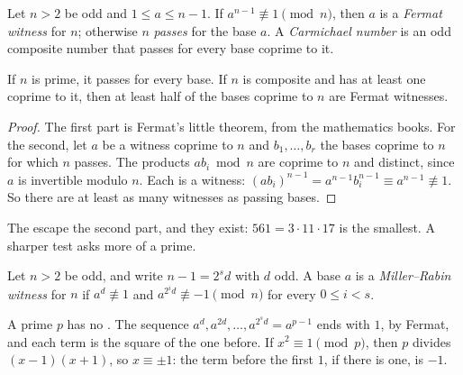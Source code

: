 \begin{definition}\label{def:b2:randomised-algorithms:fermat}
Let $n > 2$ be odd and $1 \leq a \leq n - 1$. If $a^{n-1} \not\equiv 1 \pmod n$, then $a$ is a \emph{Fermat
witness} for $n$; otherwise $n$ \emph{passes} for the base $a$. A \emph{Carmichael
number} is an odd composite number that passes for every base coprime to it.
\end{definition}

\begin{proposition}\label{prop:b2:randomised-algorithms:fermat}
If $n$ is prime, it passes for every base. If $n$ is composite and has at least one  coprime to it, then at
least half of the bases coprime to $n$ are Fermat witnesses.
\end{proposition}

\begin{proof}
The first part is Fermat's little theorem, from the mathematics books. For the second, let $a$ be a witness coprime to
$n$ and $b_1, \dots, b_r$ the bases coprime to $n$ for which $n$ passes. The products $ab_i \bmod n$ are coprime to $n$
and distinct, since $a$ is invertible modulo $n$. Each is a witness: $(ab_i)^{n-1} = a^{n-1} b_i^{n-1} \equiv a^{n-1}
\not\equiv 1$. So there are at least as many witnesses as passing bases.
\end{proof}

The  escape the second part, and they exist: $561 = 3 \cdot 11 \cdot 17$ is the smallest. A sharper
test asks more of a prime.

\begin{definition}\label{def:b2:randomised-algorithms:miller-rabin}
Let $n > 2$ be odd, and write $n - 1 = 2^s d$ with $d$ odd. A base $a$ is a \emph{Miller--Rabin witness} for $n$ if $a^d \not\equiv 1$ and $a^{2^i d} \not\equiv -1 \pmod n$ for every $0 \leq i < s$.
\end{definition}

A prime $p$ has no . The sequence $a^d, a^{2d}, \dots, a^{2^s d} = a^{p-1}$ ends with $1$, by
Fermat, and each term is the square of the one before. If $x^2 \equiv 1 \pmod p$, then $p$ divides $(x - 1)(x + 1)$, so
$x \equiv \pm 1$: the term before the first $1$, if there is one, is $-1$.

